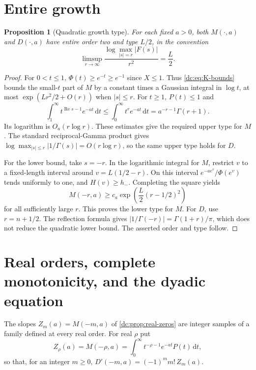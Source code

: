 \documentclass[11pt,a4paper,oneside,openany]{book}
\numberwithin{equation}{chapter}
\newtheorem{proposition}[theorem]{Proposition}
\theoremstyle{definition}
\theoremstyle{remark}
\newcommand{\dd}{\,\mathrm d}
\newcommand{\abs}[1]{\left\lvert #1\right\rvert}
\DeclareMathOperator{\Rea}{Re}
\begin{document}
\section{Entire growth}
\begin{proposition}[Quadratic growth type]
\label{dc:prop:growth}
For each fixed $a>0$, both $M(\cdot,a)$ and $D(\cdot,a)$ have entire
order two and type $L/2$, in the convention
\[
 \limsup_{r\to\infty}\frac{\log\max_{\abs s=r}\abs{F(s)}}{r^2}
 =\frac L2.
\]
\end{proposition}
\begin{proof}
For $0<t\le1$, $\Phi(t)\ge e^{-t}\ge e^{-1}$ since $X\le1$.
Thus \cref{dc:eq:K-bounds} bounds the small-$t$ part of $M$ by a
constant times a Gaussian integral in $\log t$, at most
$\exp(Lr^2/2+O(r))$ when $\abs s\le r$.
For $t\ge1$, $P(t)\le1$ and
\[
 \int_1^\infty t^{\Rea s-1}e^{-at}\dd t
 \le\int_0^\infty t^r e^{-at}\dd t
 =a^{-r-1}\Gamma(r+1).
\]
Its logarithm is $O_a(r\log r)$. These estimates give the required
upper type for $M$. The standard reciprocal-Gamma product gives
$\log\max_{\abs s\le r}\abs{1/\Gamma(s)}=O(r\log r)$, so the same
upper type holds for $D$.

For the lower bound, take $s=-r$. In the logarithmic integral for
$M$, restrict $v$ to a fixed-length interval around
$v=L(1/2-r)$. On this interval $e^{-ae^v}/\Phi(e^v)$ tends uniformly
to one, and $H(v)\ge h_-$. Completing the square yields
\[
 M(-r,a)\ge c_a\exp\left(\frac L2(r-1/2)^2\right)
\]
for all sufficiently large $r$. This proves the lower type for $M$.
For $D$, use $r=n+1/2$. The reflection formula gives
$\abs{1/\Gamma(-r)}=\Gamma(1+r)/\pi$, which does not reduce the
quadratic lower bound. The asserted order and type follow.
\end{proof}


\section{Real orders, complete monotonicity, and the dyadic equation}
The slopes $Z_m(a)=M(-m,a)$ of \cref{dc:prop:real-zeros} are integer samples
of a family defined at every real order. For real $\rho$ put
\begin{equation}\label{ra:eq:mainquantities}
 Z_\rho(a)=M(-\rho,a)=\int_0^\infty t^{-\rho-1}e^{-at}P(t)\dd t,
\end{equation}
so that, for an integer $m\ge0$, $D'(-m,a)=(-1)^mm!\,Z_m(a)$.
\end{document}
